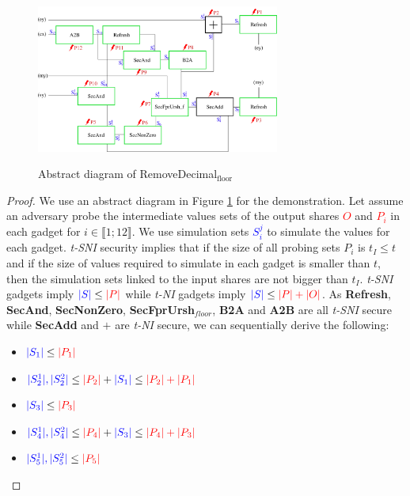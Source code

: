 \documentclass[runningheads]{llncs}
\begin{document}
\begin{figure}[!ht]
  \centering
  \includegraphics[width=8cm]{figure/RemoveDec2.pdf}
  \label{fig:RemoveDec}
  \caption{Abstract diagram of RemoveDecimal$_\text{floor}$}
\end{figure}
\begin{proof}
  We use an abstract diagram in Figure \ref{fig:RemoveDec} for the demonstration. Let assume an adversary probe the intermediate values sets of the output shares \textcolor{red}{$O$} and \textcolor{red}{$P_i$} in each gadget for $i\in\llbracket 1;12 \rrbracket$. We use simulation sets \textcolor{blue}{$S_i^j$} to simulate the values for each gadget. \emph{t-SNI} security implies that if the size of all probing sets $P_i$ is $t_I\leq t$ and if the size of values required to simulate in each gadget is smaller than $t$, then the simulation sets linked to the input shares are not bigger than $t_I$. \emph{t-SNI} gadgets imply $\textcolor{blue}{|S|} \leq \textcolor{red}{|P|}$ while \emph{t-NI} gadgets imply $\textcolor{blue}{|S|} \leq \textcolor{red}{|P|+|O|}$. As \textbf{Refresh}, \textbf{SecAnd}, \textbf{SecNonZero}, \textbf{SecFprUrsh$_{floor}$}, \textbf{B2A} and \textbf{A2B} are all \emph{t-SNI} secure while \textbf{SecAdd} and \textbf{$+$} are \emph{t-NI} secure, we can sequentially derive the following:
  \begin{multicols}{2}
    \begin{itemize}
      \item $\textcolor{blue}{|S_1|} \leq \textcolor{red}{|P_1|}$
      \item $\textcolor{blue}{|S_2^1|,|S_2^2|} \leq \textcolor{red}{|P_2|} + \textcolor{blue}{|S_1|} \leq \textcolor{red}{|P_2|+|P_1|}$
      \item $\textcolor{blue}{|S_3|} \leq \textcolor{red}{|P_3|}$
      \item $\textcolor{blue}{|S_4^1|,|S_4^2|} \leq \textcolor{red}{|P_4|} + \textcolor{blue}{|S_3|} \leq \textcolor{red}{|P_4|+|P_3|}$
      \item $\textcolor{blue}{|S_5^1|,|S_5^2|} \leq \textcolor{red}{|P_5|}$

\end{itemize}
\end{multicols}
\end{proof}
\end{document}
